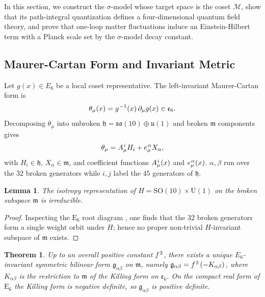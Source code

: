\documentclass[pdflatex,sn-mathphys-num]{sn-jnl}
\theoremstyle{thmstyleone}
\newtheorem{theorem}{Theorem}
\newtheorem{lemma}[lemma]{Lemma}
\theoremstyle{thmstyletwo}%
\theoremstyle{thmstylethree}%
\newcommand{\SO}[1]{\mathrm{SO(#1)}}
\newcommand{\U}[1]{\mathrm{U(#1)}}
\newcommand{\E}[1]{\mathrm{E_{#1}}}
\newcommand{\M}{\mathcal{M}}
\newcommand{\SOTen}{\SO{10}}
\newcommand{\UOne}{\U{1}}
\newcommand{\ESix}{\E{6}}
\newcommand{\SOTenXUOne}{\SOTen \times \UOne}
\newcommand{\sm}{\hspace{.065em}}
\newcommand{\smexp}[1]{^{\sm #1}}
\begin{document}
In this section, we construct the $\sigma$-model whose target space is the coset $\M$, show that its path-integral quantization defines a four-dimensional quantum field theory, and prove that one-loop matter fluctuations induce an Einstein-Hilbert term with a Planck scale set by the $\sigma$-model decay constant.

\subsection{Maurer-Cartan Form and Invariant Metric}
\label{subsec:MC}

Let $g(x)\in E_{6}$ be a local coset representative.  
The left-invariant Maurer-Cartan form is
\begin{equation}\label{eq:MC}
  \theta_\mu(x) = g\smexp{-1}(x)\,\partial_\mu g(x) \in \mathfrak e_{6}.
\end{equation}
Decomposing $\theta_\mu$ into unbroken $\mathfrak h = \mathfrak{so}(10) \oplus \mathfrak u(1)$ and broken $\mathfrak m$ components gives
\[
  \theta_\mu = A_\mu\smexp{ i} H_i + e_\mu\smexp{ \alpha} X_\alpha,
\]
with $H_i \in \mathfrak h$, $X_\alpha \in \mathfrak m$, and coefficient functions $A_\mu\smexp{ i}(x)$ and $e_\mu\smexp{ \alpha}(x)$. $\alpha,\beta$ run over the $32$ broken generators while $i,j$ label the $45$ generators of $\mathfrak h$.

\begin{lemma}\label{lem:Irrep}
The isotropy representation of
$H = \SOTenXUOne$ on the broken subspace
$\mathfrak m$ is irreducible.
\end{lemma}

\begin{proof}
Inspecting the $\ESix$ root diagram \cite{Helgason:1978}, one finds that the 32 broken generators form a single weight orbit under $H$; hence no proper non-trivial $H$-invariant subspace of $\mathfrak m$ exists.
\end{proof}

\begin{theorem}\label{thm:uniqueMetric}
Up to an overall positive constant $f\smexp{2}$, there exists a unique
$E_{6}$-invariant symmetric bilinear form $\mathfrak g_{\alpha\beta}$ on
$\mathfrak m$, namely
$\mathfrak g_{\alpha\beta} = f\smexp{2}\,(-K_{\alpha\beta})$, where
$K_{\alpha\beta}$ is the restriction to $\mathfrak m$ of the Killing form on
$\mathfrak e_{6}$. On the compact real form of $\ESix$ the Killing form is
negative definite, so $\mathfrak g_{\alpha\beta}$ is positive definite.
\end{theorem}
\end{document}
